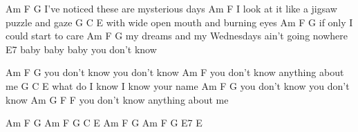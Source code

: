 Am                 F               G
I've noticed these are mysterious days
             Am                        F
I look at it like a jigsaw puzzle and gaze
               G                 C     E
with wide open mouth and burning eyes
Am       F               G
if only I could start to care
Am                                      F      G
my dreams and my Wednesdays ain't going nowhere
E7
baby baby baby you don't know


Am             F                G
you don't know you don't know
               Am             F
you don't know anything about me
        G                  C      E
what do I know I know your name
Am             F               G
you don't know you don't know
               Am G           F    F
you don't know anything about me


Am F G Am F G C E
Am F G Am F G E7 E
\endverse

\endsong
